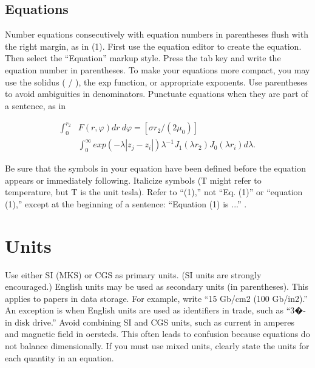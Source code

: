 \documentclass[journal]{IEEEtranTICPS}
\begin{document}
\subsection{Equations}
Number equations consecutively with equation numbers in parentheses flush with the right margin, as in (1). First use the equation editor to create the equation. Then select the ``Equation'' markup style. Press the tab key and write the equation number in parentheses. To make your equations more compact, you may use the solidus ( / ), the exp function, or appropriate exponents. Use parentheses to avoid ambiguities in denominators. Punctuate equations when they are part of a sentence, as in	


\begin{align}
\nonumber\mathbf \int_{0}^{{r}_2} & F(r,\varphi) dr \ d\varphi = [\sigma{r}_2 / (2{\mu}_0)]
\\
& \int_{0}^{\infty} exp(-\lambda|{z}_j - {z}_i|){\lambda}^{-1} {J}_1 (\lambda {r}_2) {J}_0 (\lambda {r}_i) d \lambda .
\end{align}


Be sure that the symbols in your equation have been defined before the equation appears or immediately following. Italicize symbols (T might refer to temperature, but T is the unit tesla). Refer to ``(1),'' not ``Eq. (1)'' or ``equation (1),'' except at the beginning of a sentence: ``Equation (1) is ...'' .
		
\section{Units}

Use either SI (MKS) or CGS as primary units. (SI units are strongly encouraged.) English units may be used as secondary units (in parentheses). This applies to papers in data storage. For example, write ``15 Gb/cm2 (100 Gb/in2).'' An exception is when English units are used as identifiers in trade, such as ``3�-in disk drive.'' Avoid combining SI and CGS units, such as current in amperes and magnetic field in oersteds. This often leads to confusion because equations do not balance dimensionally. If you must use mixed units, clearly state the units for each quantity in an equation.
\end{document}
